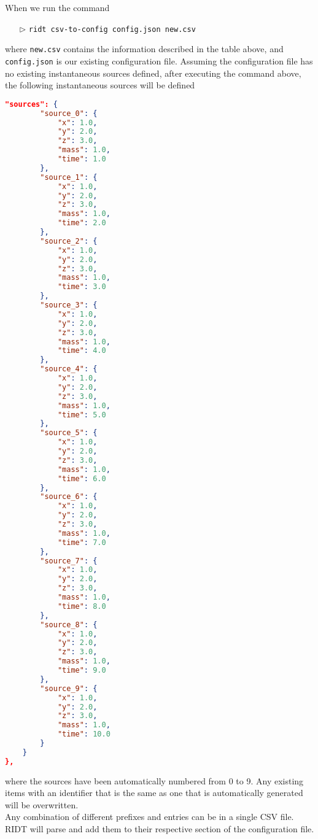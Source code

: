 \documentclass[]{article}
\def\code#1{\texttt{#1}}
\begin{document}
\noindent When we run the command
\begin{itemize}
    \item[$\triangleright$] \code{ridt csv-to-config config.json new.csv}
\end{itemize}

\noindent where \code{new.csv} contains the information described in the table above, and
\code{config.json} is our existing configuration file. Assuming the
configuration file has no existing instantaneous sources defined, after
executing the command above, the following instantaneous sources will be defined

\begin{lstlisting}[language=json,firstnumber=1]
"sources": {
        "source_0": {
            "x": 1.0,
            "y": 2.0,
            "z": 3.0,
            "mass": 1.0,
            "time": 1.0
        },
        "source_1": {
            "x": 1.0,
            "y": 2.0,
            "z": 3.0,
            "mass": 1.0,
            "time": 2.0
        },
        "source_2": {
            "x": 1.0,
            "y": 2.0,
            "z": 3.0,
            "mass": 1.0,
            "time": 3.0
        },
        "source_3": {
            "x": 1.0,
            "y": 2.0,
            "z": 3.0,
            "mass": 1.0,
            "time": 4.0
        },
        "source_4": {
            "x": 1.0,
            "y": 2.0,
            "z": 3.0,
            "mass": 1.0,
            "time": 5.0
        },
        "source_5": {
            "x": 1.0,
            "y": 2.0,
            "z": 3.0,
            "mass": 1.0,
            "time": 6.0
        },
        "source_6": {
            "x": 1.0,
            "y": 2.0,
            "z": 3.0,
            "mass": 1.0,
            "time": 7.0
        },
        "source_7": {
            "x": 1.0,
            "y": 2.0,
            "z": 3.0,
            "mass": 1.0,
            "time": 8.0
        },
        "source_8": {
            "x": 1.0,
            "y": 2.0,
            "z": 3.0,
            "mass": 1.0,
            "time": 9.0
        },
        "source_9": {
            "x": 1.0,
            "y": 2.0,
            "z": 3.0,
            "mass": 1.0,
            "time": 10.0
        }
    }
},
\end{lstlisting}
where the sources have been automatically numbered from 0 to 9. Any existing
items with an identifier that is the same as one that is automatically generated
will be overwritten. \\

\noindent Any combination of different prefixes and entries can be in a single
CSV file. RIDT will parse and add them to their respective section of the
configuration file.
\end{document}
